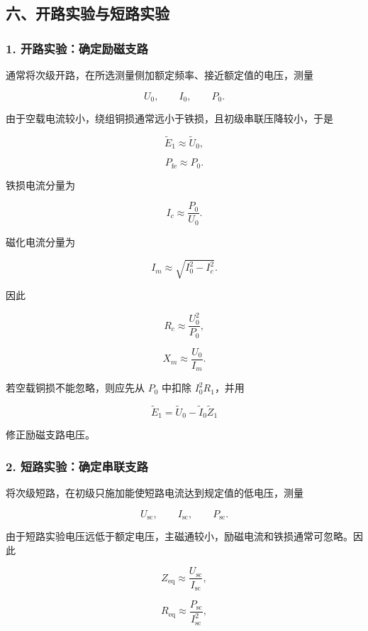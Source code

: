 \subsection{六、开路实验与短路实验}\label{m6:ux516dux5f00ux8defux5b9eux9a8cux4e0eux77edux8defux5b9eux9a8c}

\subsubsection{1.
开路实验：确定励磁支路}\label{m6:ux5f00ux8defux5b9eux9a8cux786eux5b9aux52b1ux78c1ux652fux8def}

通常将次级开路，在所选测量侧加额定频率、接近额定值的电压，测量

\[
U_0,\qquad I_0,\qquad P_0.
\]

由于空载电流较小，绕组铜损通常远小于铁损，且初级串联压降较小，于是

\[
\widetilde E_1\approx\widetilde U_0,
\]

\[
P_{\mathrm{fe}}\approx P_0.
\]

铁损电流分量为

\[
\boxed{I_c\approx\frac{P_0}{U_0}}.
\]

磁化电流分量为

\[
\boxed{I_m\approx
\sqrt{I_0^2-I_c^2}}.
\]

因此

\[
\boxed{R_c\approx\frac{U_0^2}{P_0}},
\]

\[
\boxed{X_m\approx\frac{U_0}{I_m}}.
\]

若空载铜损不能忽略，则应先从 \(P_0\) 中扣除 \(I_0^2R_1\)，并用

\[
\widetilde E_1
=\widetilde U_0-\widetilde I_0\widetilde Z_1
\]

修正励磁支路电压。

\subsubsection{2.
短路实验：确定串联支路}\label{m6:ux77edux8defux5b9eux9a8cux786eux5b9aux4e32ux8054ux652fux8def}

将次级短路，在初级只施加能使短路电流达到规定值的低电压，测量

\[
U_{\mathrm{sc}},
\qquad
I_{\mathrm{sc}},
\qquad
P_{\mathrm{sc}}.
\]

由于短路实验电压远低于额定电压，主磁通较小，励磁电流和铁损通常可忽略。因此

\[
\boxed{Z_{\mathrm{eq}}
\approx\frac{U_{\mathrm{sc}}}{I_{\mathrm{sc}}}},
\]

\[
\boxed{R_{\mathrm{eq}}
\approx\frac{P_{\mathrm{sc}}}{I_{\mathrm{sc}}^2}},
\]

